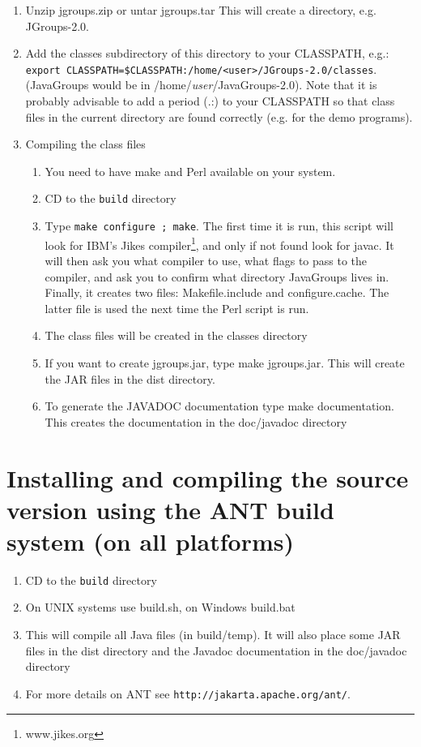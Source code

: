   \begin{enumerate}
  \item Unzip jgroups.zip or untar jgroups.tar This will create a directory, e.g. JGroups-2.0.
  \item Add the classes subdirectory of this directory to your CLASSPATH, e.g.: 
        {\tt export CLASSPATH=\$CLASSPATH:/home/<user>/JGroups-2.0/classes}.
             (JavaGroups would be in /home/{\em user}/JavaGroups-2.0). Note that it is
             probably advisable to add a period (.:) to your
             CLASSPATH so that class files in the current directory are found
             correctly (e.g. for the demo programs). 
  \item Compiling the class files
    \begin{enumerate} 
    \item You need to have make and Perl available on your system. 
    \item CD to the {\tt build} directory
    \item Type {\tt make configure ; make}. The first time it is run,
          this script will look for IBM's Jikes compiler\footnote{www.jikes.org}, and only if not
          found look for javac. It will then ask you what compiler to use, what flags
          to pass to the compiler, and ask you to confirm
          what directory JavaGroups lives in. Finally, it creates two files:
	  Makefile.include and configure.cache. The latter file is used the next time the Perl script is run. 
    \item The class files will be created in the classes directory 
    \item If you want to create jgroups.jar, type make jgroups.jar. This will
          create the JAR files in the dist directory.
    \item To generate the JAVADOC documentation type make documentation. This creates
          the documentation in the doc/javadoc directory  
    \end{enumerate} 
  \end{enumerate}



  \section{Installing and compiling the source version using the ANT build system (on all platforms)}

  \begin{enumerate}
  \item CD to the {\tt build} directory
  \item On UNIX systems use build.sh, on Windows build.bat 
  \item This will compile all Java files (in build/temp). It will also place some JAR
        files in the dist directory and the Javadoc documentation in the doc/javadoc directory 
  \item For more details on ANT see {\tt http://jakarta.apache.org/ant/}.
  \end{enumerate}


